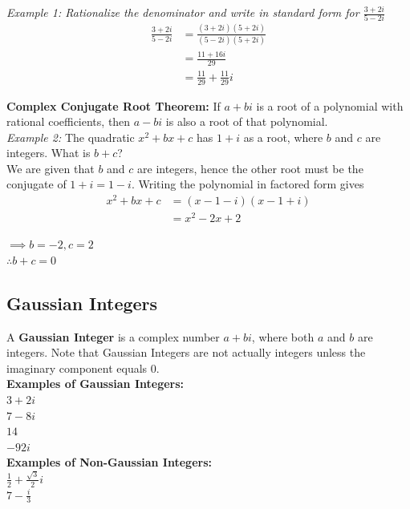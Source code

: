 \documentclass{article}
\begin{document}
            \noindent \textit{Example 1: Rationalize the denominator and write in standard form for
            $\frac{3+2i}{5-2i}$} \\

            \begin{align*}
                \frac{3+2i}{5-2i} &= \frac{(3+2i)(5+2i)}{(5-2i)(5+2i)} \\
                &= \frac{11+16i}{29} \\
                &= \frac{11}{29} + \frac{11}{29}i
            \end{align*}

            \noindent \textbf{Complex Conjugate Root Theorem:} If $a+bi$ is a root of a polynomial
            with rational coefficients, then $a-bi$ is also a root of that polynomial. \\
            \textit{Example 2:} The quadratic $x^2+bx+c$ has $1+i$ as a root, where $b$ and $c$ are
            integers. What is $b+c$? \\
            We are given that $b$ and $c$ are integers, hence the other root must be the conjugate
            of $1+i=1-i$. Writing the polynomial in factored form gives \\

            \begin{align*}
                x^2+bx+c &= (x-1-i)(x-1+i) \\
                &= x^2-2x+2
            \end{align*}

            \noindent $\implies b=-2,c=2$ \\
            $\therefore b+c=0$


        \subsection{Gaussian Integers}
            A \textbf{Gaussian Integer} is a complex number $a+bi$, where both $a$ and $b$ are integers.
            Note that Gaussian Integers are not actually integers unless the imaginary component equals 0. \\

            \noindent \textbf{Examples of Gaussian Integers:} \\
            $3+2i$ \\
            $7-8i$ \\
            $14$ \\
            $-92i$ \\
            \noindent \textbf{Examples of Non-Gaussian Integers:} \\
            $\frac{1}{2}+\frac{\sqrt{3}}{2}i$ \\
            $7-\frac{i}{3}$
\end{document}
